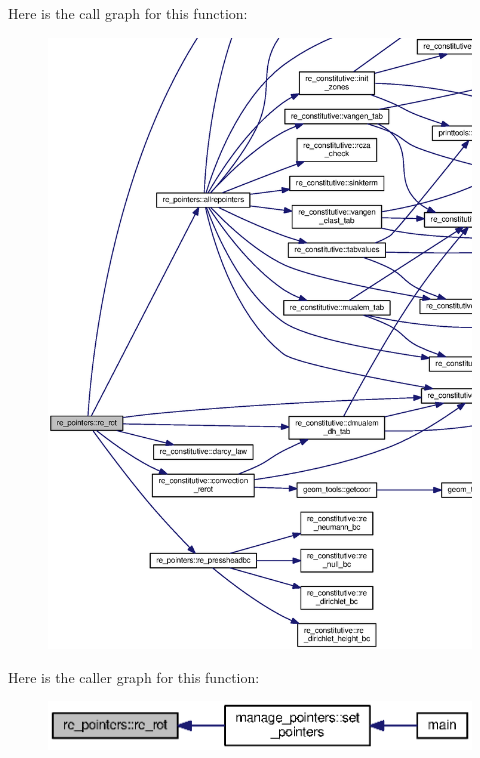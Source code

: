 Here is the call graph for this function\+:\nopagebreak
\begin{figure}[H]
\begin{center}
\leavevmode
\includegraphics[width=350pt]{namespacere__pointers_a4f4fd0e928850ecdd8a81e8d55a70143_cgraph}
\end{center}
\end{figure}




Here is the caller graph for this function\+:\nopagebreak
\begin{figure}[H]
\begin{center}
\leavevmode
\includegraphics[width=350pt]{namespacere__pointers_a4f4fd0e928850ecdd8a81e8d55a70143_icgraph}
\end{center}
\end{figure}


